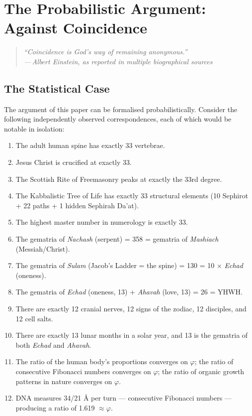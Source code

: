 \documentclass[12pt, a4paper]{article}
\newcommand{\epigraph}[2]{%
  \begin{quote}
    \itshape ``#1''\\[0.3em]
    \normalfont\small\hfill ---\,#2
  \end{quote}
}
\begin{document}
\section{The Probabilistic Argument: Against Coincidence}
\label{sec:probability}

\epigraph{Coincidence is God's way of remaining anonymous.}{Albert Einstein,
as reported in multiple biographical sources}

\subsection{The Statistical Case}

The argument of this paper can be formalised probabilistically. Consider the
following independently observed correspondences, each of which would be
notable in isolation:

\begin{enumerate}[leftmargin=1.5cm, label=\textbf{\arabic*.}]
  \item The adult human spine has exactly 33 vertebrae.
  \item Jesus Christ is crucified at exactly 33.
  \item The Scottish Rite of Freemasonry peaks at exactly the 33rd degree.
  \item The Kabbalistic Tree of Life has exactly 33 structural elements (10 Sephirot
  + 22 paths + 1 hidden Sephirah Da'at).
  \item The highest master number in numerology is exactly 33.
  \item The gematria of \emph{Nachash} (serpent) = 358 = gematria of \emph{Mashiach}
  (Messiah/Christ).
  \item The gematria of \emph{Sulam} (Jacob's Ladder = the spine) = 130 = 10 ×
  \emph{Echad} (oneness).
  \item The gematria of \emph{Echad} (oneness, 13) + \emph{Ahavah} (love, 13) =
  26 = YHWH.
  \item There are exactly 12 cranial nerves, 12 signs of the zodiac, 12 disciples,
  and 12 cell salts.
  \item There are exactly 13 lunar months in a solar year, and 13 is the gematria
  of both \emph{Echad} and \emph{Ahavah}.
  \item The ratio of the human body's proportions converges on $\varphi$; the ratio
  of consecutive Fibonacci numbers converges on $\varphi$; the ratio of organic
  growth patterns in nature converges on $\varphi$.
  \item DNA measures 34/21 \AA{} per turn — consecutive Fibonacci numbers —
  producing a ratio of 1.619 $\approx \varphi$.
\end{enumerate}
\end{document}
